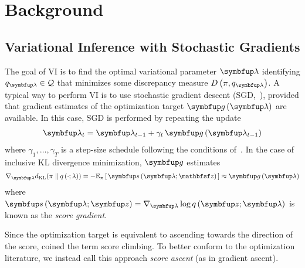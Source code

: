 
\vspace{-0.1in}
\section{Background}
\subsection{Variational Inference with Stochastic Gradients}\label{section:ivi_previous}
The goal of VI is to find the optimal variational parameter \(\vlambda\) identifying \(q_{\vlambda} \in \mathcal{Q}\) that minimizes some discrepancy measure \(D\left(\pi, q_{\vlambda}\right)\).
A typical way to perform VI is to use stochastic gradient descent (SGD,~\citealt{robbins_stochastic_1951}), provided that gradient estimates of the optimization target \(\vg\,(\vlambda)\) are available.
In this case, SGD is performed by repeating the update
{%
\begin{align*}
  \vlambda_{t} = \vlambda_{t-1} + \gamma_{t} \, \vg\left(\vlambda_{t-1}\right)
\end{align*}
}
where \(\gamma_1, \ldots, \gamma_T\) is a step-size schedule following the conditions of~\citet{robbins_stochastic_1951, bottou_online_1999}.
In the case of inclusive KL divergence minimization, \(\vg\) estimates
%
{%
\begin{align*}
  \nabla_{\vlambda} \DKL{\pi}{q\left(\cdot; \lambda\right)}
  = -\Esub{\pi}{ \vs\,(\vlambda; \rvvz) } 
  \approx \vg\left(\vlambda\right)
\end{align*}
}%
%
where \(\vs\,(\vlambda;\vz) = \nabla_{\vlambda} \log q\,(\vz; \vlambda)\) is known as the \textit{score gradient}.

Since the optimization target is equivalent to ascending towards the direction of the score, \citet{NEURIPS2020_b2070693} coined the term score climbing.
To better conform to the optimization literature, we instead call this approach \textit{score ascent} (as in gradient ascent).

